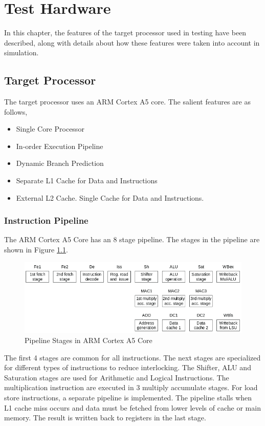 \chapter{Test Hardware}

In this chapter, the features of the target processor used in testing have been described, along with details about how these features were taken into account in simulation. 

\section{Target Processor}
The target processor uses an ARM Cortex A5 core. The salient features are as follows,

\begin{itemize}
\item Single Core Processor
\item In-order Execution Pipeline
\item Dynamic Branch Prediction
\item Separate L1 Cache for Data and Instructions
\item External L2 Cache. Single Cache for Data and Instructions.
\end{itemize}

\subsection{Instruction Pipeline}
The ARM Cortex A5 Core has an 8 stage pipeline. The stages in the pipeline are shown in Figure \ref{fig:pipelineA5}.

\begin{figure}[h]
\includegraphics[width=\textwidth]{figures/pipeline.png}
\caption{Pipeline Stages in ARM Cortex A5 Core \cite{CortexA5TRM}}
\label{fig:pipelineA5}
\end{figure}

The first 4 stages are common for all instructions. The next stages are specialized for different types of instructions to reduce interlocking. The Shifter, ALU and Saturation stages are used for Arithmetic and Logical Instructions. The multiplication instruction are executed in 3 multiply accumulate stages. For load store instructions, a separate pipeline is implemented. The pipeline stalls when L1 cache miss occurs and data must be fetched from lower levels of cache or main memory. The result is written back to registers in the last stage.

